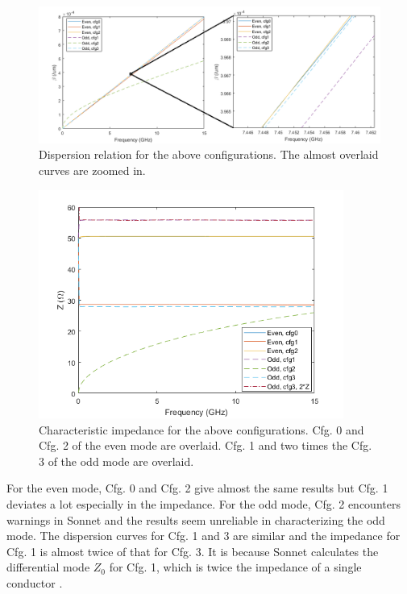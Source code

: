 \documentclass[noshowpacs,amsmath,
superscriptaddress,
10pt]{article}
\begin{document}
\begin{figure}[!ht]
\centering
\includegraphics[width=15cm] {Dispersion_all}
\caption{Dispersion relation for the above configurations. The almost overlaid curves are zoomed in.}
\label{pic:Dispersion_all}
\end{figure}

\begin{figure}[!ht]
\centering
\includegraphics[width=10cm] {Impedance_all}
\caption{Characteristic impedance for the above configurations. Cfg. 0 and Cfg. 2 of the even mode are overlaid. Cfg. 1 and two times the Cfg. 3 of the odd mode are overlaid.}
\label{pic:Dispersion_all}
\end{figure}

For the even mode, Cfg. 0 and Cfg. 2 give almost the same results but Cfg. 1 deviates a lot especially in the impedance. For the odd mode, Cfg. 2 encounters warnings in Sonnet and the results seem unreliable in characterizing the odd mode. The dispersion curves for Cfg. 1 and 3 are similar and the impedance for Cfg. 1 is almost twice of that for Cfg. 3. It is because Sonnet calculates the differential mode $Z_0$ for Cfg. 1, which is twice the impedance of a single conductor \cite{smolyansky2000characterization}.
\end{document}
